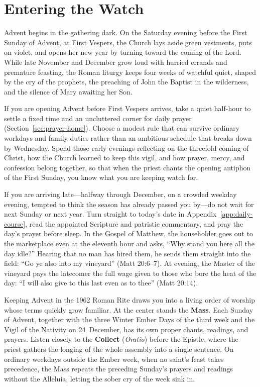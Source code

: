 \section{Entering the Watch}\label{sec:entering}

Advent begins in the gathering dark. On the Saturday evening before the
First Sunday of Advent, at First Vespers, the Church lays aside green
vestments, puts on violet, and opens her new year by turning toward the
coming of the Lord. While late November and December grow loud with hurried
errands and premature feasting, the Roman liturgy keeps four weeks of
watchful quiet, shaped by the cry of the prophets, the preaching of John
the Baptist in the wilderness, and the silence of Mary awaiting her Son.

If you are opening Advent before First Vespers arrives, take a quiet
half-hour to settle a fixed time and an uncluttered corner for daily prayer
(Section~\ref{sec:prayer-home}). Choose a modest rule that can survive
ordinary workdays and family duties rather than an ambitious schedule that
breaks down by Wednesday. Spend those early evenings reflecting on the
threefold coming of Christ, how the Church learned to keep this vigil, and
how prayer, mercy, and confession belong together, so that when the priest
chants the opening antiphon of the First Sunday, you know what you are
keeping watch for.

If you are arriving late---halfway through December, on a crowded weekday
evening, tempted to think the season has already passed you by---do not
wait for next Sunday or next year. Turn straight to today's date in
Appendix~\ref{app:daily-course}, read the appointed Scripture and patristic
commentary, and pray the day's prayer before sleep. In the Gospel of
Matthew, the householder goes out to the marketplace even at the eleventh
hour and asks, ``Why stand you here all the day idle?'' Hearing that no man
has hired them, he sends them straight into the field: ``Go ye also into my
vineyard'' (Matt 20:6--7). At evening, the Master of the vineyard pays the
latecomer the full wage given to those who bore the heat of the day: ``I
will also give to this last even as to thee'' (Matt 20:14).

Keeping Advent in the 1962 Roman Rite draws you into a living order of
worship whose terms quickly grow familiar. At the center stands the
\textbf{Mass}. Each Sunday of Advent, together with the three Winter Ember
Days of the third week and the Vigil of the Nativity on 24~December, has
its own proper chants, readings, and prayers. Listen closely to the
\textbf{Collect} (\textit{Oratio}) before the Epistle, where the priest
gathers the longing of the whole assembly into a single sentence. On
ordinary weekdays outside the Ember week, when no saint's feast takes
precedence, the Mass repeats the preceding Sunday's prayers and readings
without the Alleluia, letting the sober cry of the week sink in.

